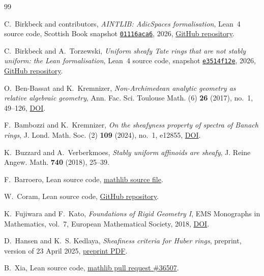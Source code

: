 \documentclass[11pt,reqno]{amsart}
\theoremstyle{definition}
\begin{document}
\begin{thebibliography}{99}

C.~Birkbeck and contributors,
\emph{AINTLIB: AdicSpaces formalisation},
Lean~4 source code, Scottish Book snapshot
\href{https://github.com/CBirkbeck/AINTLIB/commit/01116aca6070283726008536cba16d165a01b505}{\texttt{01116aca6}},
2026, \href{https://github.com/CBirkbeck/AINTLIB}{GitHub repository}.

C.~Birkbeck and A.~Torzewski,
\emph{Uniform sheafy Tate rings that are not stably uniform: the Lean
formalisation},
Lean~4 source code, snapshot
\href{https://github.com/CBirkbeck/uniform-sheafy-tate-domains-lean/commit/e3514f12e382a8ef8f0d2b8822ed9b792bcaf838}{\texttt{e3514f12e}},
2026, \href{https://github.com/CBirkbeck/uniform-sheafy-tate-domains-lean}{GitHub repository}.

O.~Ben-Bassat and K.~Kremnizer,
\emph{Non-Archimedean analytic geometry as relative algebraic geometry},
Ann. Fac. Sci. Toulouse Math. (6) \textbf{26} (2017), no.~1, 49--126,
\href{https://doi.org/10.5802/afst.1526}{DOI}.

F.~Bambozzi and K.~Kremnizer,
\emph{On the sheafyness property of spectra of Banach rings},
J. Lond. Math. Soc. (2) \textbf{109} (2024), no.~1, e12855,
\href{https://doi.org/10.1112/jlms.12855}{DOI}.

K.~Buzzard and A.~Verberkmoes,
\emph{Stably uniform affinoids are sheafy},
J. Reine Angew. Math. \textbf{740} (2018), 25--39.

F.~Barroero,
Lean source code,
\href{https://github.com/leanprover-community/mathlib4/blob/fd1d54bcac5caba4eff2ea3421c47d907333f515/Mathlib/RingTheory/PowerSeries/GaussNorm.lean}{mathlib source file}.

W.~Coram,
Lean source code,
\href{https://github.com/WilliamCoram/PhD/tree/e8fcf8fbff848a95475ab62ae2568cbb73961de8}{GitHub repository}.

K.~Fujiwara and F.~Kato,
\emph{Foundations of Rigid Geometry I},
EMS Monographs in Mathematics, vol.~7,
European Mathematical Society, 2018,
\href{https://doi.org/10.4171/135}{DOI}.

D.~Hansen and K.~S. Kedlaya,
\emph{Sheafiness criteria for Huber rings},
preprint, version of 23 April 2025,
\href{https://kskedlaya.org/papers/criteria.pdf}{preprint PDF}.

B.~Xia,
Lean source code,
\href{https://github.com/leanprover-community/mathlib4/pull/36507}{mathlib pull request \#36507}.


\end{thebibliography}
\end{document}
